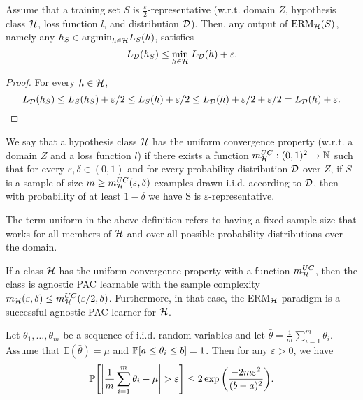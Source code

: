 \documentclass[11pt,a4paper]{article}
\begin{document}
\begin{proposition}
Assume that a training set $S$ is $\frac{\varepsilon}{2}$-representative (w.r.t. domain $Z$, hypothesis class $\mathcal{H}$, loss function $l$, and distribution $\mathcal{D}$). Then, any output of $\text{ERM}_{\mathcal{H}}(S)$, namely any $h_S\in\text{argmin}_{h\in\mathcal{H}} L_S(h)$, satisfies
\begin{equation*}
    L_{\mathcal{D}}(h_S)\le \underset{h\in\mathcal{H}}{\text{min}}\; L_{\mathcal{D}}(h) + \varepsilon.
\end{equation*}
\end{proposition}

\begin{proof}
For every $h\in\mathcal{H}$,
\begin{equation*}
L_{\mathcal{D}}(h_S)\le L_S(h_S) + \varepsilon/2 \le L_S(h) + \varepsilon/2 \le L_{\mathcal{D}}(h) + \varepsilon/2 + \varepsilon/2 = L_{\mathcal{D}}(h) + \varepsilon.
\end{equation*}
\end{proof}

\begin{definition}
We say that a hypothesis class $\mathcal{H}$ has the uniform convergence property (w.r.t. a domain $Z$ and a loss function $l$) if there exists a function $m_{\mathcal{H}}^{UC}:(0,1)^2\rightarrow \mathbb{N}$ such that for every $\varepsilon,\delta\in(0,1)$ and for every probability distribution $\mathcal{D}$ over $Z$, if $S$ is a sample of size $m\ge m_{\mathcal{H}}^{UC}(\varepsilon,\delta)$ examples drawn i.i.d. according to $\mathcal{D}$, then with probability of at least $1-\delta$ we have S is $\varepsilon$-representative.
\end{definition}

\begin{remark}
The term uniform in the above definition refers to having a fixed sample size that works for all members of $\mathcal{H}$ and over all possible probability distributions over the domain.
\end{remark}

\begin{corollary}
If a class $\mathcal{H}$ has the uniform convergence property with a function $m_{\mathcal{H}}^{UC}$, then the class is agnostic PAC learnable with the sample complexity $m_{\mathcal{H}}(\varepsilon,\delta)\le m_{\mathcal{H}}^{UC}(\varepsilon/2,\delta)$. Furthermore, in that case, the ERM$_{\mathcal{H}}$ paradigm is a successful agnostic PAC learner for $\mathcal{H}$.
\end{corollary}

\begin{lemma}
Let $\theta_1,\ldots,\theta_m$ be a sequence of i.i.d. random variables and let $\bar{\theta} = \tfrac{1}{m} \sum_{i=1}^m \theta_i$. Assume that $\mathbb{E}(\bar{\theta}) = \mu$ and $\mathbb{P}[a\le \theta_i\le b] = 1$. Then for any $\varepsilon>0$, we have
\begin{equation*}
\Prob\Bigg[ \Bigg| \dfrac{1}{m}\sum_{i=1}^m\theta_i - \mu \Bigg|>\varepsilon \Bigg] \le 2 \exp{\bigg(\dfrac{-2m\varepsilon^2}{(b-a)^2} \bigg)}.
\end{equation*}
\end{lemma}
\end{document}
